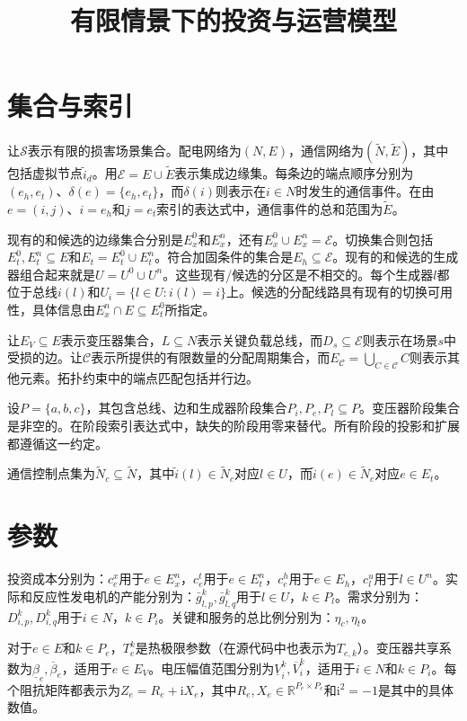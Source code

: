\documentclass[11pt]{article}
\title{有限情景下的投资与运营模型}
\author{}
\date{}
\begin{document}
\maketitle

\section{集合与索引}
让$\mathcal S$表示有限的损害场景集合。配电网络为$(N,E)$，通信网络为$(\widetilde N,\widetilde E)$，其中包括虚拟节点$\widetilde i_d$。用$\mathcal E=E\cup\widetilde E$表示集成边缘集。每条边的端点顺序分别为$(e_h,e_t)$、$\delta(e)=\{e_h,e_t\}$，而$\delta(i)$则表示在$i\in N$时发生的通信事件。在由$e=(i,j)$、$i=e_h$和$j=e_t$索引的表达式中，通信事件的总和范围为$\widetilde E$。

现有的和候选的边缘集合分别是$E_x^0$和$E_x^n$，还有$E_x^0\cup E_x^n=\mathcal E$。切换集合则包括$E_t^0,E_t^n\subseteq E$和$E_t=E_t^0\cup E_t^n$。符合加固条件的集合是$E_h\subseteq\mathcal E$。现有的和候选的生成器组合起来就是$U=U^0\cup U^n$。这些现有/候选的分区是不相交的。每个生成器$l$都位于总线$i(l)$和$U_i=\{l\in U:i(l)=i\}$上。候选的分配线路具有现有的切换可用性，具体信息由$E_x^n\cap E\subseteq E_t^0$所指定。

让$E_V\subseteq E$表示变压器集合，$L\subseteq N$表示关键负载总线，而$D_s\subseteq\mathcal E$则表示在场景$s$中受损的边。让$\mathcal C$表示所提供的有限数量的分配周期集合，而$E_{\mathcal C}=\bigcup_{C\in\mathcal C}C$则表示其他元素。拓扑约束中的端点匹配包括并行边。

设$P=\{a,b,c\}$，其包含总线、边和生成器阶段集合$P_i,P_e,P_l\subseteq P$。变压器阶段集合是非空的。在阶段索引表达式中，缺失的阶段用零来替代。所有阶段的投影和扩展都遵循这一约定。

通信控制点集为$\widetilde N_c\subseteq\widetilde N$，其中$\widetilde i(l)\in\widetilde N_c$对应$l\in U$，而$\widetilde i(e)\in\widetilde N_c$对应$e\in E_t$。

\section{参数}
投资成本分别为：$c_e^x$用于$e\in E_x^n$，$c_e^t$用于$e\in E_t^n$，$c_e^h$用于$e\in E_h$，$c_l^u$用于$l\in U^n$。实际和反应性发电机的产能分别为：$\bar g_{l,p}^k,\bar g_{l,q}^k$用于$l\in U$，$k\in P_l$。需求分别为：$D_{i,p}^k,D_{i,q}^k$用于$i\in N$，$k\in P_i$。关键和服务的总比例分别为：$\eta_c,\eta_t$。

对于$e\in E$和$k\in P_e$，$T_e^k$是热极限参数（在源代码中也表示为$T_{e,k}$）。变压器共享系数为$\underline\beta_e,\overline\beta_e$，适用于$e\in E_V$。电压幅值范围分别为$\underline V_i^k,\overline V_i^k$，适用于$i\in N$和$k\in P_i$。每个阻抗矩阵都表示为$Z_e=R_e+\mathrm i X_e$，其中$R_e,X_e\in\mathbb R^{P_e\times P_e}$和$\mathrm i^2=-1$是其中的具体数值。
\end{document}
